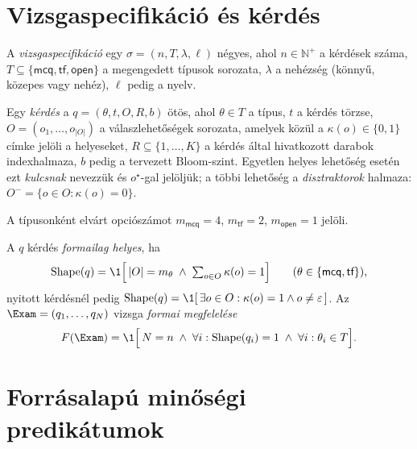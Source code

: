 \section{Vizsgaspecifikáció és kérdés}

\begin{definicio}[Vizsgaspecifikáció]
A \emph{vizsgaspecifikáció} egy $\sigma=(n,T,\lambda,\ell)$ négyes, ahol $n\in\mathbb{N}^{+}$ a
kérdések száma, $T\subseteq\{\textsf{mcq},\textsf{tf},\textsf{open}\}$ a megengedett típusok
sorozata, $\lambda$ a nehézség (könnyű, közepes vagy nehéz), $\ell$ pedig a nyelv.
\end{definicio}

\begin{definicio}[Kérdés]
Egy \emph{kérdés} a $q=(\theta,t,O,R,b)$ ötös, ahol $\theta\in T$ a típus, $t$ a kérdés törzse,
$O=(o_1,\dots,o_{|O|})$ a válaszlehetőségek sorozata, amelyek közül a $\kappa(o)\in\{0,1\}$ címke jelöli a
helyeseket, $R\subseteq\{1,\dots,K\}$ a kérdés által hivatkozott darabok indexhalmaza, $b$ pedig a
tervezett Bloom-szint. Egyetlen helyes lehetőség esetén ezt \emph{kulcsnak} nevezzük és $o^{\star}$-gal
jelöljük; a többi lehetőség a \emph{disztraktorok} halmaza: $O^{-}=\{o\in O:\kappa(o)=0\}$.
\end{definicio}

A típusonként elvárt opciószámot $m_{\textsf{mcq}}=4$, $m_{\textsf{tf}}=2$, $m_{\textsf{open}}=1$ jelöli.

\begin{definicio}
A $q$ kérdés \emph{formailag helyes}, ha
\begin{equation}
\mathrm{Shape}(q)=\1\Bigl[\,|O|=m_{\theta}\;\wedge\;\textstyle\sum_{o\in O}\kappa(o)=1\Bigr]
\qquad(\theta\in\{\textsf{mcq},\textsf{tf}\}),
\end{equation}
nyitott kérdésnél pedig $\mathrm{Shape}(q)=\1[\,\exists o\in O:\kappa(o)=1 \wedge o\ne\varepsilon\,]$.
Az $\Exam=(q_1,\dots,q_N)$ vizsga \emph{formai megfelelése}
\begin{equation}
F(\Exam)=\1\Bigl[\,N=n\;\wedge\;\forall i:\mathrm{Shape}(q_i)=1\;\wedge\;\forall i:\theta_i\in T\Bigr].
\label{eq:format}
\end{equation}
\end{definicio}

\section{Forrásalapú minőségi predikátumok}

